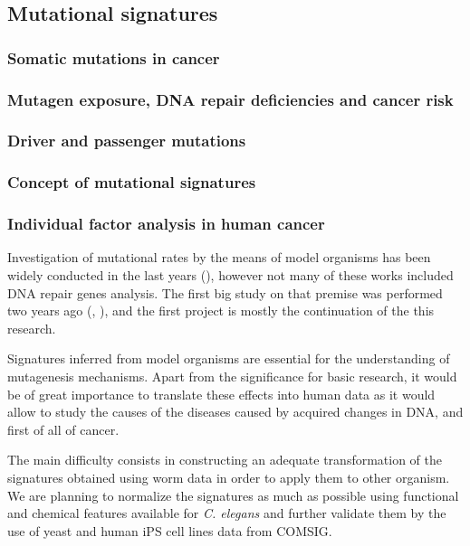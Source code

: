 

\pagestyle{empty}
\subsection{Mutational signatures}





\subsubsection{Somatic mutations in cancer}

\subsubsection*{Mutagen exposure, DNA repair deficiencies and cancer risk}

\subsubsection*{Driver and passenger mutations}








\subsubsection{Concept of mutational signatures}

\subsubsection*{Individual factor analysis in human cancer }

Investigation of mutational rates by the means of model organisms has been widely conducted in the last years (\cite{Segovia}), however not many of these works included DNA repair genes analysis. The first big study on that premise was performed two years ago (\cite{Meier1}, \cite{Meier2}), and the first project is mostly the continuation of the this research.

Signatures inferred from model organisms are essential for the understanding of mutagenesis mechanisms. Apart from the significance for basic research, it would be of great importance to  translate these effects into human data as it would allow to study the causes of the diseases caused by acquired changes in DNA, and first of all of cancer.

The main difficulty consists in constructing an adequate transformation of the signatures obtained using worm data in order to apply them to other organism. We are planning to normalize the signatures as much as possible using functional and chemical features available for \textit{C. elegans} and further validate them by the use of yeast and human iPS cell lines data from COMSIG.

